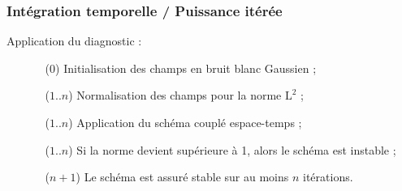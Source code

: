 \begin{frame}
\frametitle{Intégration temporelle / Puissance itérée}
\vfill
Application du diagnostic :
\begin{itemize}
\item[] 
\begin{itemize}
\item [(0)] Initialisation des champs en bruit blanc Gaussien ;
\item [($1$..$n$)] Normalisation des champs pour la norme $\mathrm{L}^2$ ;
\item [($1$..$n$)] Application du schéma couplé espace-temps ;
\item [($1$..$n$)] Si la norme devient supérieure à 1, alors le schéma est instable ;
\item [($n+1$)] Le schéma est assuré stable sur au moins $n$ itérations.
\end{itemize}
\end{itemize}
\vfill
\begin{columns}[c]
\scalebox{0.7}{\begin{minipage}{1.42\textwidth}
\begin{figure}
\centering
		\begin{tikzpicture}[scale=1]
		\begin{semilogxaxis}[
		axis lines=middle,
		xlabel=Itérations, %
		ylabel=$\Norm{\A \W^n}$,%
		xmin=1,%
		ymax=1.002,
		ytick={0.999,1,1.001},
		yticklabel style={/pgf/number format/.cd,fixed,precision=3},
		x post scale=1,
		y post scale=0.75,
		legend style={at={(axis cs:1000,1.002)},anchor=north west}
		]
		
%		
%		
%		
%		
		\addplot[
		thick,
		mark=none,
		color=green,
		] table {../puissance_iteree/norms_cfl31.plt};
		\addlegendentry{$\beta=3.1$}
		

\end{semilogxaxis}
\end{tikzpicture}
\end{figure}
\end{minipage}}
\end{columns}
\end{frame}
